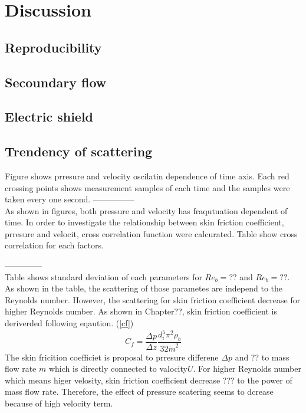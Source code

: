\documentclass[12pt,oneside]{jbook}
\begin{document}
\clearpage
\section{Discussion}
\subsection{Reproducibility}
\subsection{Secoundary flow}
\subsection{Electric shield}


\clearpage
\subsection{Trendency of scattering}
Figure shows prresure and velocity oscilatin dependence of time axis.
Each red crossing points shows measurement samples of each time and the samples were taken every one second.
---------------\\
As shown in figures, both pressure and velocity has fraqutuation dependent of time.
In order to investigate the relationship between skin friction coefficient, prresure and velocit, cross correlation function were calcurated.
Table show cross correlation for each factors.
\begin{table}

\end{table}

--------------\\
Table shows standard deviation of each parameters for $Re_{b}=??$ and $Re_{b}=??$.
As shown in the table, the scattering of those parametes are independ to the Reynolds number.
However, the scattering for skin friction coefficient decrease for higher Reynolds number.
As shown in Chapter??, skin friction coefficient is deriverded following eqaution. (\ref{cf})
\begin{equation}
    C_{f} = \frac{\Delta p}{\Delta z} \frac{d_{i}^{5}\pi^{2}\rho_{b}}{32\dot{m}^{2}}
    \label{cf}
\end{equation}
The skin fricition coefficiet is proposal to prresure differene $\Delta p$ and ?? to mass flow rate $\dot{m}$ which is directly connected to valocity$U$.
For higher Reynolds number which means higer velosity, skin friction coefficient decrease ??? to the power of mass flow rate.
Therefore, the effect of pressure scatering seems to dcrease because of high velocity term.\\
\end{document}

